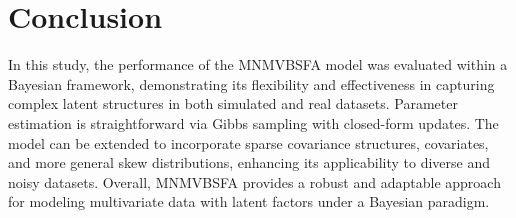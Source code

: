 \documentclass[twoside]{article}
\theoremstyle{definition}
\begin{document}
\section{Conclusion}
\vspace{-0.5cm}
In this study, the performance of the MNMVBSFA model was evaluated within a Bayesian framework, demonstrating its flexibility and effectiveness in capturing complex latent structures in both simulated and real datasets. Parameter estimation is straightforward via Gibbs sampling with closed-form updates. The model can be extended to incorporate sparse covariance structures, covariates, and more general skew distributions, enhancing its applicability to diverse and noisy datasets. Overall, MNMVBSFA provides a robust and adaptable approach for modeling multivariate data with latent factors under a Bayesian paradigm.
\end{document}
